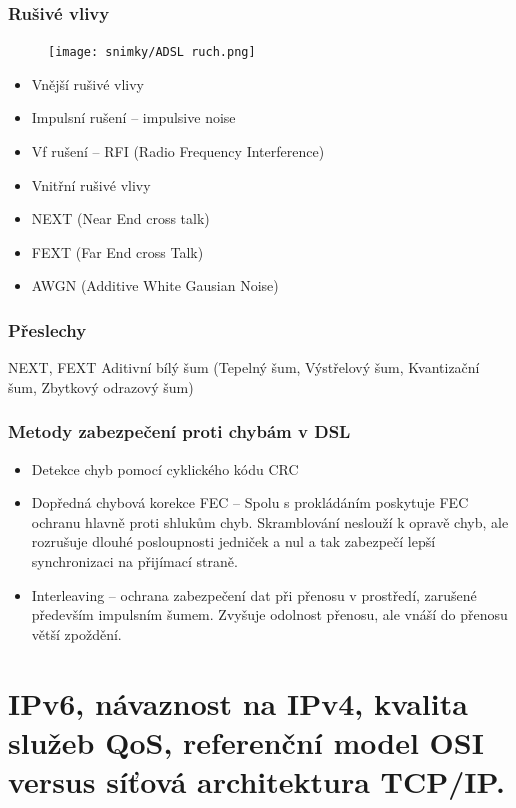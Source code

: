 \subsubsection{Rušivé vlivy}
\begin{figure} [h]
    \centering
    \texttt{[image: snimky/ADSL ruch.png]}
    \label{fig:adsl-ruch}
\end{figure}
\begin{itemize}
    \item Vnější rušivé vlivy
    \item Impulsní rušení -- impulsive noise
    \item Vf rušení -- RFI (Radio Frequency Interference)
    \item Vnitřní rušivé vlivy
    \item NEXT (Near End cross talk)
    \item FEXT (Far End cross Talk)
    \item AWGN (Additive White Gausian Noise)
\end{itemize}

\subsubsection{Přeslechy}
NEXT, FEXT
Aditivní bílý šum (Tepelný šum, Výstřelový šum, Kvantizační šum, Zbytkový odrazový šum)


\subsubsection{Metody zabezpečení proti chybám v DSL}
\begin{itemize}
    \item Detekce chyb pomocí cyklického kódu CRC
    \item Dopředná chybová korekce FEC -- Spolu s prokládáním poskytuje FEC ochranu hlavně proti shlukům chyb. Skramblování neslouží k opravě chyb, ale rozrušuje dlouhé posloupnosti jedniček a nul a tak zabezpečí lepší synchronizaci na přijímací straně.
    \item Interleaving -- ochrana zabezpečení dat při přenosu v prostředí, zarušené především impulsním šumem. Zvyšuje odolnost přenosu, ale vnáší do přenosu větší zpoždění.
\end{itemize}


\clearpage
\section{IPv6, návaznost na IPv4, kvalita služeb QoS, referenční model OSI versus síťová architektura TCP/IP.}


